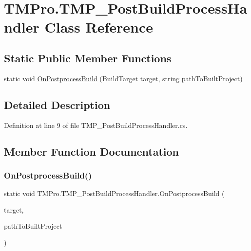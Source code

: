 \hypertarget{class_t_m_pro_1_1_t_m_p___post_build_process_handler}{}\section{T\+M\+Pro.\+T\+M\+P\+\_\+\+Post\+Build\+Process\+Handler Class Reference}
\label{class_t_m_pro_1_1_t_m_p___post_build_process_handler}
\subsection*{Static Public Member Functions}
\begin{DoxyCompactItemize}
\item 
static void \mbox{\hyperlink{class_t_m_pro_1_1_t_m_p___post_build_process_handler_a9bde99d05c661af7fece9c790de8905a}{On\+Postprocess\+Build}} (Build\+Target target, string path\+To\+Built\+Project)
\end{DoxyCompactItemize}


\subsection{Detailed Description}


Definition at line 9 of file T\+M\+P\+\_\+\+Post\+Build\+Process\+Handler.\+cs.



\subsection{Member Function Documentation}
\mbox{\label{class_t_m_pro_1_1_t_m_p___post_build_process_handler_a9bde99d05c661af7fece9c790de8905a}} 
\subsubsection{\texorpdfstring{OnPostprocessBuild()}{OnPostprocessBuild()}}
{\footnotesize\ttfamily static void T\+M\+Pro.\+T\+M\+P\+\_\+\+Post\+Build\+Process\+Handler.\+On\+Postprocess\+Build (\begin{DoxyParamCaption}\item[{Build\+Target}]{target,  }\item[{string}]{path\+To\+Built\+Project }\end{DoxyParamCaption})\hspace{0.3cm}{\ttfamily [static]}}



